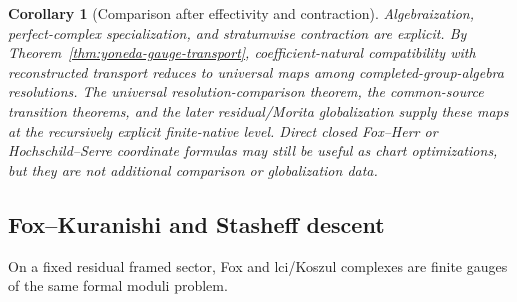 \documentclass[11pt]{article}
\newtheorem{corollary}[theorem]{Corollary}
\theoremstyle{definition}
\begin{document}
\begin{corollary}[Comparison after effectivity and contraction]\label{cor:after-effectivity-contraction}
Algebraization, perfect-complex specialization, and stratumwise contraction are explicit.  By Theorem~\ref{thm:yoneda-gauge-transport}, coefficient-natural compatibility with reconstructed transport reduces to universal maps among completed-group-algebra resolutions.  The universal resolution-comparison theorem, the common-source transition theorems, and the later residual/Morita globalization supply these maps at the recursively explicit finite-native level.  Direct closed Fox--Herr or Hochschild--Serre coordinate formulas may still be useful as chart optimizations, but they are not additional comparison or globalization data.
\end{corollary}

\subsection{Fox--Kuranishi and Stasheff descent}\label{subsec:fox-kuranishi-stasheff}

On a fixed residual framed sector, Fox and lci/Koszul complexes are finite gauges of the same formal moduli problem.
\end{document}
